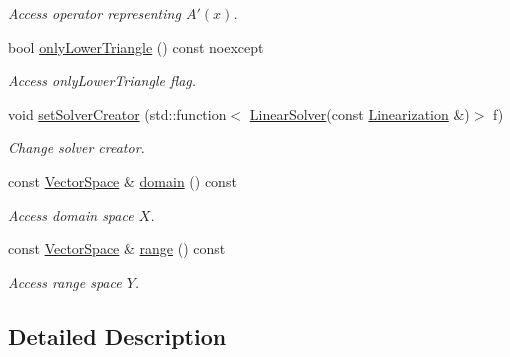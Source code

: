 \begin{DoxyCompactItemize}
\begin{DoxyCompactList}\small\item\em Access operator representing $A'(x)$. \end{DoxyCompactList}\item 
bool \hyperlink{classSpacy_1_1Kaskade_1_1C1Operator_adb85b50e1cc87fb342412560353c2f73}{only\+Lower\+Triangle} () const noexcept
\begin{DoxyCompactList}\small\item\em Access only\+Lower\+Triangle flag. \end{DoxyCompactList}\item 
void \hyperlink{classSpacy_1_1Kaskade_1_1C1Operator_aa0c69955542db6b0f61807181874b4d9}{set\+Solver\+Creator} (std\+::function$<$ \hyperlink{namespaceSpacy_adcd0d78166a9c972b8a2e5a689fc2d03}{Linear\+Solver}(const \hyperlink{classSpacy_1_1Kaskade_1_1LinearOperator}{Linearization} \&)$>$ f)
\begin{DoxyCompactList}\small\item\em Change solver creator. \end{DoxyCompactList}\item 
const \hyperlink{classSpacy_1_1VectorSpace}{Vector\+Space} \& \hyperlink{classSpacy_1_1OperatorBase_a2588f9b3e0188820c4c494e63293dc6f}{domain} () const \hypertarget{classSpacy_1_1OperatorBase_a2588f9b3e0188820c4c494e63293dc6f}{}\label{classSpacy_1_1OperatorBase_a2588f9b3e0188820c4c494e63293dc6f}

\begin{DoxyCompactList}\small\item\em Access domain space $X$. \end{DoxyCompactList}\item 
const \hyperlink{classSpacy_1_1VectorSpace}{Vector\+Space} \& \hyperlink{classSpacy_1_1OperatorBase_ab19d3b7a6f290b1079248f1e567e53d6}{range} () const \hypertarget{classSpacy_1_1OperatorBase_ab19d3b7a6f290b1079248f1e567e53d6}{}\label{classSpacy_1_1OperatorBase_ab19d3b7a6f290b1079248f1e567e53d6}

\begin{DoxyCompactList}\small\item\em Access range space $Y$. \end{DoxyCompactList}\end{DoxyCompactItemize}


\subsection{Detailed Description}
